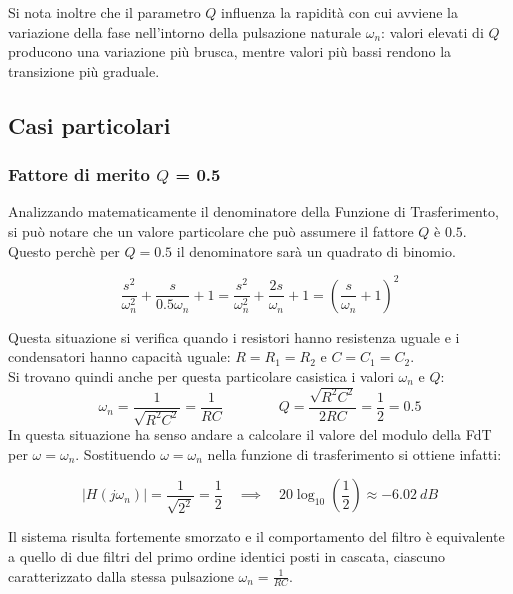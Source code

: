 Si nota inoltre che il parametro $Q$ influenza la rapidità con cui avviene la variazione della fase nell'intorno della pulsazione naturale $\omega_n$: valori elevati di $Q$ producono una variazione più brusca, mentre valori più bassi rendono la transizione più graduale.

\subsection{Casi particolari}
\subsubsection{Fattore di merito \texorpdfstring{$Q$}{Q} = 0.5}

Analizzando matematicamente il denominatore della Funzione di Trasferimento, si può notare che un valore particolare che può assumere il fattore $Q$ è $0.5$. Questo perchè per $Q = 0.5$ il denominatore sarà un quadrato di binomio. 

\begin{equation}
\frac{s^2}{\omega_n^2} + \frac{s}{0.5\omega_n} + 1 = \frac{s^2}{\omega_n^2} + \frac{2s}{\omega_n} + 1 = \left(\frac{s}{\omega_n}+1\right)^2
\label{eq: Completamento quadrato LP}
\end{equation}

Questa situazione si verifica quando i resistori hanno resistenza uguale e i condensatori hanno capacità uguale: $R = R_1 = R_2$ e $C = C_1 = C_2$.\\
Si trovano quindi anche per questa particolare casistica i valori $\omega_n$ e $Q$:
\begin{equation}
    \omega_n = \frac{1}{\sqrt{R^2C^2}} = \frac{1}{RC}\qquad\qquad
    Q = \frac{\sqrt{R^2 C^2}}{2RC} = \frac{1}{2} = 0.5
    \label{eq: wn Q 0.5 LP}
\end{equation}
In questa situazione ha senso andare a calcolare il valore del modulo della FdT per $\omega = \omega_n$. 
Sostituendo $\omega = \omega_n$ nella funzione di trasferimento si ottiene infatti:

\begin{equation}
\left|H(j\omega_n)\right| = \frac{1}{\sqrt{2^2}} = \frac{1}{2}
\quad\implies\quad
20\log_{10}\left(\frac{1}{2}\right) \approx \SI{-6.02}{dB}
\label{eq: Modulo in dB LP}
\end{equation}

Il sistema risulta fortemente smorzato e il comportamento del filtro è equivalente a quello di due filtri del primo ordine identici posti in cascata, ciascuno caratterizzato dalla stessa pulsazione $\omega_n = \frac{1}{RC}$.

